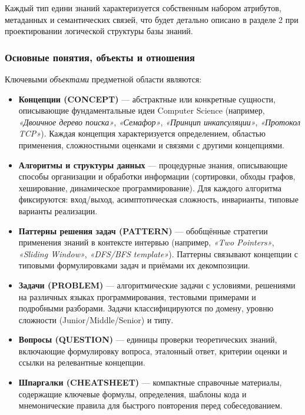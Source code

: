 Каждый тип едини знаний характеризуется собственным набором атрибутов, метаданных и семантических связей, что будет детально описано в разделе 2 при проектировании логической структуры базы знаний.

\subsubsection*{Основные понятия, объекты и отношения}

Ключевыми \textit{объектами} предметной области являются:

\begin{itemize}
    \item \textbf{Концепции (CONCEPT)} — абстрактные или конкретные сущности, описывающие фундаментальные идеи Computer Science (например, \textit{«Двоичное дерево поиска»}, \textit{«Семафор»}, \textit{«Принцип инкапсуляции»}, \textit{«Протокол TCP»}). Каждая концепция характеризуется определением, областью применения, сложностными оценками и связями с другими концепциями.
    
    \item \textbf{Алгоритмы и структуры данных} — процедурные знания, описывающие способы организации и обработки информации (сортировки, обходы графов, хеширование, динамическое программирование). Для каждого алгоритма фиксируются: вход/выход, асимптотическая сложность, инварианты, типовые варианты реализации.
    
    \item \textbf{Паттерны решения задач (PATTERN)} — обобщённые стратегии применения знаний в контексте интервью (например, \textit{«Two Pointers»}, \textit{«Sliding Window»}, \textit{«DFS/BFS template»}). Паттерны связывают концепции с типовыми формулировками задач и приёмами их декомпозиции.
    
    \item \textbf{Задачи (PROBLEM)} — алгоритмические задачи с условиями, решениями на различных языках программирования, тестовыми примерами и подробными разборами. Задачи классифицируются по домену, уровню сложности (Junior/Middle/Senior) и типу.
    
    \item \textbf{Вопросы (QUESTION)} — единицы проверки теоретических знаний, включающие формулировку вопроса, эталонный ответ, критерии оценки и ссылки на релевантные концепции.
    
    \item \textbf{Шпаргалки (CHEATSHEET)} — компактные справочные материалы, содержащие ключевые формулы, определения, шаблоны кода и мнемонические правила для быстрого повторения перед собеседованием.
    

\end{itemize}

